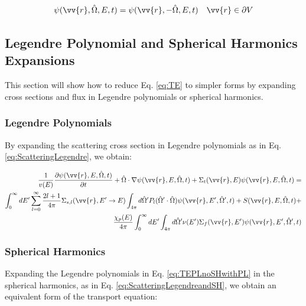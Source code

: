 \documentclass[10pt]{article}
\begin{document}
\begin{flushleft}
\begin{equation}
\psi(\vv{r},\hat{\Omega},E,t)=\psi(\vv{r},-\hat{\Omega},E,t)\quad\vv{r}\in\partial V
\end{equation}

\subsection{Legendre Polynomial and Spherical Harmonics Expansions}
This section will show how to reduce Eq. \eqref{eq:TE} to simpler forms by expanding cross sections and flux in Legendre polynomials or spherical harmonics.

\subsubsection{Legendre Polynomials}

By expanding the scattering cross section in Legendre polynomials as in Eq. \ref{eq:ScatteringLegendre}, we obtain:

\begin{equation}
\label{eq:TEPLnoSHwithPL}
\begin{aligned}
\frac{1}{v(E)} \frac{\partial\psi(\vv{r}, E, \hat{\Omega},t)}{\partial t} +
 \hat{\Omega}\cdot\nabla\psi(\vv{r}, E, \hat{\Omega},t) + 
 \Sigma_t(\vv{r},E)\psi(\vv{r}, E, \hat{\Omega},t) = \\
 \int_{0}^{\infty}dE' \sum_{l=0}^{\infty} \frac{2l+1}{4\pi}\Sigma_{s,l}(\vv{r}, E'\rightarrow E) \int_{4\pi}^{} d\hat{\Omega}'P_l(\hat{\Omega}'\cdot\hat{\Omega})\psi(\vv{r}, E', \hat{\Omega}', t) + S(\vv{r}, E, \hat{\Omega},t)+\\
  \frac{\chi_p(E)}{4\pi} \int_{0}^{\infty} dE'\int_{4\pi}^{} d\hat{\Omega}'\nu(E')\Sigma_f(\vv{r}, E')\psi(\vv{r}, E', \hat{\Omega}',t)\\
\end{aligned}
\end{equation}

\subsubsection{Spherical Harmonics}

Expanding the Legendre polynomials in Eq. \eqref{eq:TEPLnoSHwithPL} in the spherical harmonics, as in Eq. \ref{eq:ScatteringLegendreandSH}, we obtain an equivalent form of the transport equation:


\end{flushleft}
\end{document}
